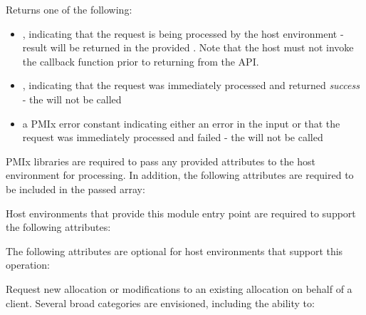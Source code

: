 Returns one of the following:

\begin{itemize}
    \item {}, indicating that the request is being processed by the host environment - result will be returned in the provided . Note that the host must not invoke the callback function prior to returning from the \ac{API}.
    \item {}, indicating that the request was immediately processed and returned \textit{success} - the  will not be called
    \item a PMIx error constant indicating either an error in the input or that the request was immediately processed and failed - the  will not be called
\end{itemize}

\reqattrstart
\ac{PMIx} libraries are required to pass any provided attributes to the host environment for processing. In addition, the following attributes are required to be included in the passed  array:


\divider

Host environments that provide this module entry point are required to support the following attributes:


\reqattrend

\optattrstart
The following attributes are optional for host environments that support this operation:


\optattrend

\descr

Request new allocation or modifications to an existing allocation on behalf of a client. Several broad categories are envisioned, including the ability to:

